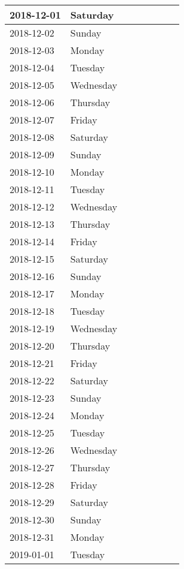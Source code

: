 \documentclass[10pt,a4paper]{article}
\begin{document}
\begin{longtable}{| p{} p{} | p{} | p{} | p{} | p{} | p{} | p{} |}
2018-12-01	&Saturday	& & & & & &\\ \hline
2018-12-02	&Sunday		& & & & & &\\ \hline
2018-12-03	&Monday		& & & & & &\\ \hline
2018-12-04	&Tuesday	& & & & & &\\ \hline
2018-12-05	&Wednesday	& & & & & &\\ \hline
2018-12-06	&Thursday	& & & & & &\\ \hline
2018-12-07	&Friday		& & & & & &\\ \hline
2018-12-08	&Saturday	& & & & & &\\ \hline
2018-12-09	&Sunday		& & & & & &\\ \hline
2018-12-10	&Monday		& & & & & &\\ \hline
2018-12-11	&Tuesday	& & & & & &\\ \hline
2018-12-12	&Wednesday	& & & & & &\\ \hline
2018-12-13	&Thursday	& & & & & &\\ \hline
2018-12-14	&Friday		& & & & & &\\ \hline
2018-12-15	&Saturday	& & & & & &\\ \hline
2018-12-16	&Sunday		& & & & & &\\ \hline
2018-12-17	&Monday		& & & & & &\\ \hline
2018-12-18	&Tuesday	& & & & & &\\ \hline
2018-12-19	&Wednesday	& & & & & &\\ \hline
2018-12-20	&Thursday	& & & & & &\\ \hline
2018-12-21	&Friday		& & & & & &\\ \hline
2018-12-22	&Saturday	& & & & & &\\ \hline
2018-12-23	&Sunday		& & & & & &\\ \hline
2018-12-24	&Monday		& & & & & &\\ \hline
2018-12-25	&Tuesday	& & & & & &\\ \hline
2018-12-26	&Wednesday	& & & & & &\\ \hline
2018-12-27	&Thursday	& & & & & &\\ \hline
2018-12-28	&Friday		& & & & & &\\ \hline
2018-12-29	&Saturday	& & & & & &\\ \hline
2018-12-30	&Sunday		& & & & & &\\ \hline
2018-12-31	&Monday		& & & & & &\\ \hline
2019-01-01	&Tuesday	& & & & & &\\ \hline

\end{longtable}
\end{document}

